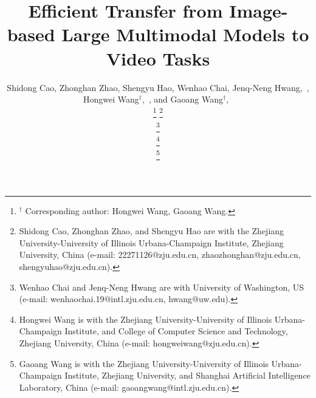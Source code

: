 \documentclass[lettersize,journal]{IEEEtran}
\begin{document}
\title{Efficient Transfer from Image-based Large Multimodal Models to Video Tasks}

\author{Shidong Cao, Zhonghan Zhao, Shengyu Hao, Wenhao Chai, Jenq-Neng Hwang,~, Hongwei Wang$^\dagger$,~, and Gaoang Wang$^\dagger$,~



\thanks{$^\dagger$ Corresponding author: Hongwei Wang, Gaoang Wang.}
\thanks{Shidong Cao, Zhonghan Zhao, and Shengyu Hao are with the Zhejiang University-University of Illinois Urbana-Champaign Institute, Zhejiang University, China (e-mail: 22271126@zju.edu.cn, zhaozhonghan@zju.edu.cn, shengyuhao@zju.edu.cn).}

\thanks{Wenhao Chai and Jenq-Neng Hwang are with University of Washington, US (e-mail: wenhaochai.19@intl.zju.edu.cn, hwang@uw.edu).}

\thanks{Hongwei Wang is with the Zhejiang University-University of Illinois Urbana-Champaign Institute, and College of Computer Science and Technology, Zhejiang University, China (e-mail: hongweiwang@zju.edu.cn).}

\thanks{Gaoang Wang is with the Zhejiang University-University of Illinois Urbana-Champaign Institute, Zhejiang University, and Shanghai Artificial Intelligence Laboratory, China (e-mail: gaoangwang@intl.zju.edu.cn).}
}



\end{document}
